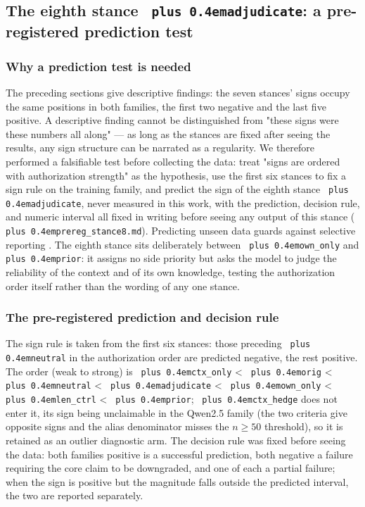 \documentclass[pdflatex,sn-basic,Numbered]{sn-jnl}
\theoremstyle{thmstyleone}
\theoremstyle{thmstyletwo}
\theoremstyle{thmstylethree}
\DeclareRobustCommand{\code}[1]{\texttt{\spaceskip=0pt plus 0.4em\relax#1}}
\begin{document}
\subsection{The eighth stance \code{adjudicate}: a pre-registered prediction test}
\label{sec:4-9}

\subsubsection{Why a prediction test is needed}
\label{sec:4-9-1}

The preceding sections give descriptive findings: the seven stances' signs occupy the same
positions in both families, the first two negative and the last five positive. A descriptive
finding cannot be distinguished from "these signs were these numbers all along" — as long as
the stances are fixed after seeing the results, any sign structure can be narrated as a
regularity. We therefore performed a falsifiable test before collecting the data: treat "signs
are ordered with authorization strength" as the hypothesis, use the first six stances to fix a
sign rule on the training family, and predict the sign of the eighth stance \code{adjudicate}, never
measured in this work, with the prediction, decision rule, and numeric interval all fixed in
writing before seeing any output of this stance (\code{prereg\_stance8.md}). Predicting unseen data
guards against selective reporting \cite{ref43,ref30}. The eighth stance sits deliberately between
\code{own\_only} and \code{prior}: it assigns no side priority but asks the model to judge the reliability
of the context and of its own knowledge, testing the authorization order itself rather than the
wording of any one stance.

\subsubsection{The pre-registered prediction and decision rule}
\label{sec:4-9-2}

The sign rule is taken from the first six stances: those preceding \code{neutral} in the
authorization order are predicted negative, the rest positive. The order (weak to strong) is
\code{ctx\_only} < \code{orig} < \code{neutral} < \code{adjudicate} < \code{own\_only} < \code{len\_ctrl} < \code{prior};
\code{ctx\_hedge} does not enter it, its sign being unclaimable in the Qwen2.5 family (the two
criteria give opposite signs and the alias denominator misses the $n\geq50$ threshold), so it
is retained as an outlier diagnostic arm. The decision rule was fixed before seeing the data:
both families positive is a successful prediction, both negative a failure requiring the core
claim to be downgraded, and one of each a partial failure; when the sign is positive but the
magnitude falls outside the predicted interval, the two are reported separately.
\end{document}

